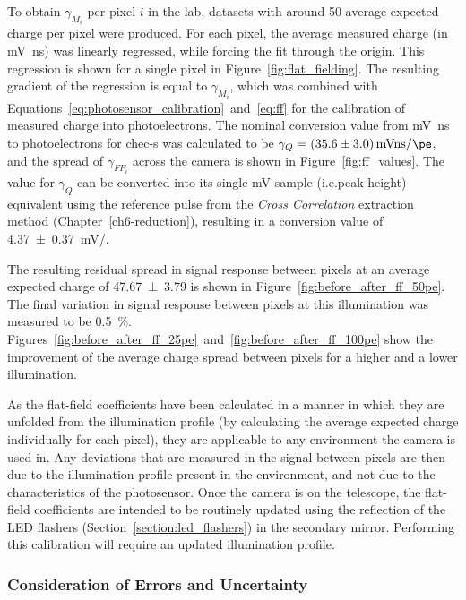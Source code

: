 To obtain $\gamma_{M_i}$ per pixel $i$ in the lab, datasets with around \SI{50}{\pe} average expected charge per pixel were produced. For each pixel, the average measured charge (in \si{mV ns}) was linearly regressed, while forcing the fit through the origin. This regression is shown for a single pixel in Figure~\ref{fig:flat_fielding}. The resulting gradient of the regression is equal to $\gamma_{M_i}$, which was combined with Equations~\ref{eq:photosensor_calibration}~and~\ref{eq:ff} for the calibration of measured charge into photoelectrons. The nominal conversion value from \si{mV ns} to photoelectrons for \gls{chec-s} was calculated to be $\gamma_Q = \SI[separate-uncertainty = true]{35.6 \pm 3.0}{mVns/\pe}$, and the spread of $\gamma_{FF_i}$ across the camera is shown in Figure~\ref{fig:ff_values}. The value for $\gamma_Q$ can be converted into its single \si{mV} sample (i.e.\@ peak-height) equivalent using the reference pulse from the \textit{Cross Correlation} extraction method (Chapter~\ref{ch6-reduction}), resulting in a conversion value of \SI[separate-uncertainty = true]{4.37 \pm 0.37}{mV/\pe}.

The resulting residual spread in signal response between pixels at an average expected charge of \SI[separate-uncertainty = true]{47.67 \pm 3.79}{\pe} is shown in Figure~\ref{fig:before_after_ff_50pe}. The final variation in signal response between pixels at this illumination was measured to be \SI{0.5}{\percent}. Figures~\ref{fig:before_after_ff_25pe}~and~\ref{fig:before_after_ff_100pe} show the improvement of the average charge spread between pixels for a higher and a lower illumination.

As the flat-field coefficients have been calculated in a manner in which they are unfolded from the illumination profile (by calculating the average expected charge individually for each pixel), they are applicable to any environment the camera is used in. Any deviations that are measured in the signal between pixels are then due to the illumination profile present in the environment, and not due to the characteristics of the photosensor. Once the camera is on the telescope, the flat-field coefficients are intended to be routinely updated using the reflection of the LED flashers (Section~\ref{section:led_flashers}) in the secondary mirror. Performing this calibration will require an updated illumination profile.

\subsubsection{Consideration of Errors and Uncertainty}

